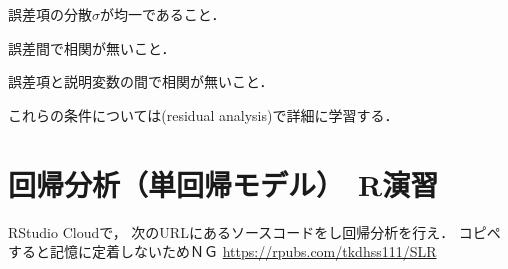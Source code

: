 \MyFrame{}
{
  \MySolution
  {
  }
}

{
  \MyItems
  {
    \item 誤差項の分散$\sigma$が均一であること． 
    \item 誤差間で相関が無いこと．
    \item 誤差項と説明変数の間で相関が無いこと．
  }
  これらの条件については(residual analysis)で詳細に学習する．
}

%

\section{回帰分析（単回帰モデル）　R演習}

\MyFrame{\insertsection}
{
  RStudio Cloudで，
  次のURLにあるソースコードをし回帰分析を行え．
  \alert{コピペすると記憶に定着しないためＮＧ}
  \url{https://rpubs.com/tkdhss111/SLR}
}

